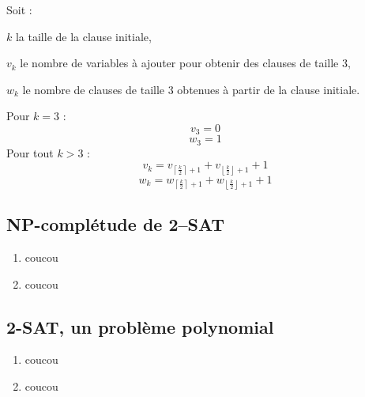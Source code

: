 \begin{enumerate}[(a)]
Soit :
\begin{description}
\item $k$ la taille de la clause initiale,
\item $v_k$ le nombre de variables à ajouter pour obtenir des clauses de taille 3,
\item $w_k$ le nombre de clauses de taille 3 obtenues à partir de la clause initiale.
\end{description}
Pour $k = 3$ :
\[ v_3 = 0 \]
\[ w_3 = 1 \]
Pour tout $k > 3$ :
\[ v_k = v_{\left \lceil \frac{k}{2} \right \rceil + 1} + v_{\left \lfloor \frac{k}{2} \right \rfloor + 1} + 1 \]
\[ w_k = w_{\left \lceil \frac{k}{2} \right \rceil + 1} + w_{\left \lfloor \frac{k}{2} \right \rfloor + 1} + 1 \]


\end{enumerate}

\subsection{NP-complétude de 2--SAT}
\begin{enumerate}
\item coucou
\item coucou
\end{enumerate}

\subsection{2-SAT, un problème polynomial}
\begin{enumerate}
\item coucou
\item coucou
\end{enumerate}
